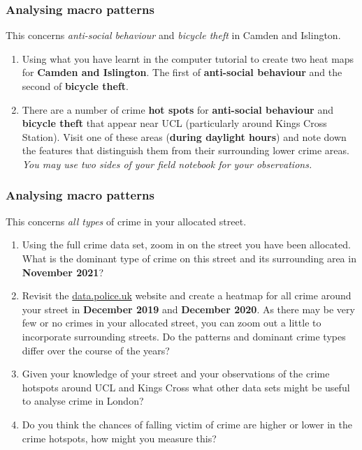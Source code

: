 \documentclass[
]{book}
\providecommand{\tightlist}{%
  \setlength{\itemsep}{0pt}\setlength{\parskip}{0pt}}
\begin{document}
\hypertarget{analysing-macro-patterns}{%
\subsubsection*{Analysing macro patterns}\label{analysing-macro-patterns}}

This concerns \emph{anti-social behaviour} and \emph{bicycle theft} in Camden and Islington.

\begin{enumerate}
\def\labelenumi{\arabic{enumi}.}
\tightlist
\item
  Using what you have learnt in the computer tutorial to create two heat maps for \textbf{Camden and Islington}. The first of \textbf{anti-social behaviour} and the second of \textbf{bicycle theft}.
\item
  There are a number of crime \textbf{hot spots} for \textbf{anti-social behaviour} and \textbf{bicycle theft} that appear near UCL (particularly around Kings Cross Station). Visit one of these areas (\textbf{during daylight hours}) and note down the features that distinguish them from their surrounding lower crime areas. \emph{You may use two sides of your field notebook for your observations.}
\end{enumerate}

\hypertarget{analysing-macro-patterns-1}{%
\subsubsection*{Analysing macro patterns}\label{analysing-macro-patterns-1}}

This concerns \emph{all types} of crime in your allocated street.

\begin{enumerate}
\def\labelenumi{\arabic{enumi}.}
\setcounter{enumi}{2}
\tightlist
\item
  Using the full crime data set, zoom in on the street you have been allocated. What is the dominant type of crime on this street and its surrounding area in \textbf{November 2021}?
\item
  Revisit the \href{https://data.police.uk/}{data.police.uk} website and create a heatmap for all crime around your street in \textbf{December 2019} and \textbf{December 2020}. As there may be very few or no crimes in your allocated street, you can zoom out a little to incorporate surrounding streets. Do the patterns and dominant crime types differ over the course of the years?
\item
  Given your knowledge of your street and your observations of the crime hotspots around UCL and Kings Cross what other data sets might be useful to analyse crime in London?
\item
  Do you think the chances of falling victim of crime are higher or lower in the crime hotspots, how might you measure this?
\end{enumerate}
\end{document}
